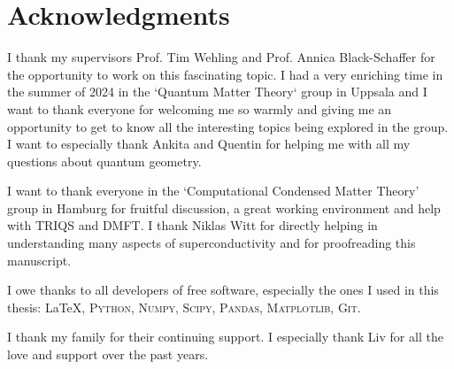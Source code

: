 \documentclass[../main.tex]{subfiles}
\begin{document}
	
\chapter*{Acknowledgments}

I thank my supervisors Prof. Tim Wehling and Prof. Annica Black-Schaffer for the opportunity to work on this fascinating topic.
I had a very enriching time in the summer of 2024 in the `Quantum Matter Theory` group in Uppsala and I want to thank everyone for welcoming me so warmly and giving me an opportunity to get to know all the interesting topics being explored in the group.
I want to especially thank Ankita and Quentin for helping me with all my questions about quantum geometry.

I want to thank everyone in the `Computational Condensed Matter Theory' group in Hamburg for fruitful discussion, a great working environment and help with TRIQS and DMFT.
I thank Niklas Witt for directly helping in understanding many aspects of superconductivity and for proofreading this manuscript.

I owe thanks to all developers of free software, especially the ones I used in this thesis: \LaTeX, \textsc{Python}, \textsc{Numpy}, \textsc{Scipy}, \textsc{Pandas}, \textsc{Matplotlib}, \textsc{Git}.

I thank my family for their continuing support.
I especially thank Liv for all the love and support over the past years.
\end{document}

